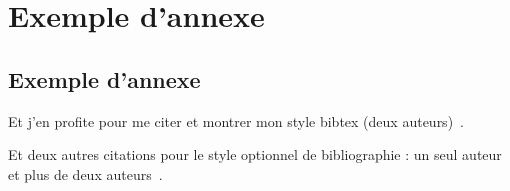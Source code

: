 
\chapter{Exemple d'annexe}
\label{chap:annexe1}

\section{Exemple d'annexe}

Et j'en profite pour me citer et montrer mon style bibtex (deux auteurs)~\cite{Commowick_MICCAI_2007}.

Et deux autres citations pour le style optionnel de bibliographie : un seul auteur~\cite{Oakes_RStat_1999} et plus de deux auteurs~\cite{Guimond_CVIU_2000}.
